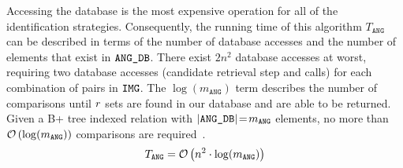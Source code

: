 
Accessing the database is the most expensive operation for all of the identification strategies.
Consequently, the running time of this algorithm $T_\texttt{ANG}$ can be described in terms of the number of database accesses and the number of elements that exist in $\texttt{ANG\_DB}$.
There exist $2n^2$ database accesses at worst, requiring two database accesses (candidate retrieval step and  calls) for each combination of pairs in $\texttt{IMG}$.
The $\log (m_\texttt{ANG})$ term describes the number of comparisons until $r$ sets are found in our database and are able to be returned.
Given a B+ tree indexed relation with $\left| \texttt{ANG\_DB} \right|\!=\! m_\texttt{ANG}$ elements, no more than $\mathcal{O} \left( \log(m_\texttt{ANG}) \right)$ comparisons are required~\cite{patel:advanceTreeStructures}.
\begin{equation}\label{eq:complexityAngle}
    T_{\texttt{ANG}} = \bigO\left( n^2 \cdot \log(m_\texttt{ANG}) \right)
\end{equation}


